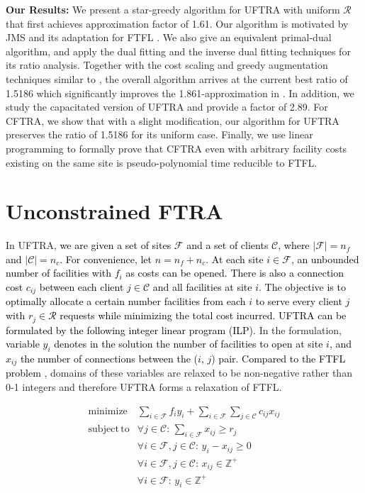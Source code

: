 \documentclass[10pt]{llncs}
\begin{document}
\textbf{Our Results:} We present a star-greedy algorithm for UFTRA
with uniform $\mathcal{R}$ that first achieves approximation factor
of 1.61. Our algorithm is motivated by JMS \cite{Jain03dualfitting}
and its adaptation for FTFL \cite{Swamy08FTFL2.076}. We also give
an equivalent primal-dual algorithm, and apply the dual fitting \cite{Jain03dualfitting}
and the inverse dual fitting \cite{shihongftfa} techniques for its
ratio analysis. Together with the cost scaling and greedy augmentation
techniques similar to \cite{Charikar051.7281.853,Mahdian021.52},
the overall algorithm arrives at the current best ratio of 1.5186
which significantly improves the 1.861-approximation in \cite{shihongftfa}.
In addition, we study the capacitated version of UFTRA and provide
a factor of 2.89. For CFTRA, we show that with a slight modification,
our algorithm for UFTRA preserves the ratio of 1.5186 for its uniform
case. Finally, we use linear programming to formally prove that CFTRA
even with arbitrary facility costs existing on the same site is pseudo-polynomial
time reducible to FTFL.


\section{Unconstrained FTRA }

In UFTRA,\textcolor{black}{{} we are given a set of sites $\mathcal{F}$
and a set of clients $\mathcal{C}$, where $\left|\mathcal{F}\right|=n_{f}$
and $\left|\mathcal{C}\right|=n_{c}$. For convenience, let $n=n_{f}+n_{c}$.
At each site $i\in\mathcal{F}$, an unbounded number of facilities
with $f_{i}$ as costs can be opened. There is also a connection cost
$c_{ij}$ between each client $j\in\mathcal{C}$ and all facilities
at site $i$. The objective is to optimally allocate a certain number
facilities from each $i$ to serve every client $j$ with $r_{j}\in\mathcal{R}$
requests while minimizing the total cost incurred. UFTRA can be formulated
by the following integer linear program (ILP). }In the formulation,
\textcolor{black}{variable $y_{i}$ denotes in the solution the number
of facilities to open at site $i$, and $x_{ij}$ the number of connections
between the ($i$, $j$) pair. Compared to the FTFL problem} \cite{Jain00FTFL},
domains of these variables are relaxed to be non-negative rather than
0-1 integers and therefore UFTRA forms a relaxation of FTFL.

{\small \begin{equation}
\begin{array}{llc}
\mathrm{minimize} & \sum_{i\in\mathcal{F}}f_{i}y_{i}+\sum_{i\in\mathcal{F}}\sum_{j\in\mathcal{C}}c_{ij}x_{ij}\\
\mathrm{subject\, to} & \forall j\in\mathcal{C}:\,\sum_{i\in\mathcal{F}}x_{ij}\ge r_{j}\\
 & \forall i\in\mathcal{F},j\in\mathcal{C}:\, y_{i}-x_{ij}\geq0\\
 & \forall i\in\mathcal{F},j\in\mathcal{C}:\, x_{ij}\in\mathbb{Z}^{+}\\
 & \forall i\in\mathcal{F}:\, y_{i}\in\mathbb{Z}^{+}\end{array}\label{eq:ucftra-ilp}\end{equation}
}{\small \par}
\end{document}
